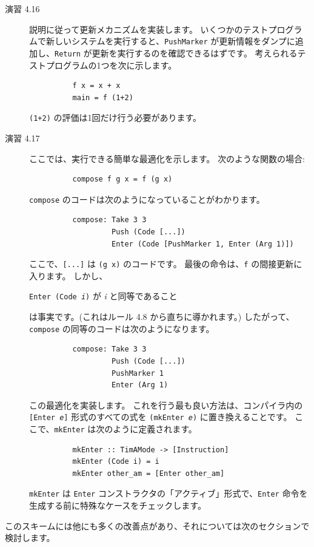 \documentclass{jbook}
\begin{document}
\begin{description}
	\item[演習 4.16] 説明に従って更新メカニズムを実装します。
		いくつかのテストプログラムで新しいシステムを実行すると、\texttt{PushMarker} が更新情報をダンプに追加し、\texttt{Return} が更新を実行するのを確認できるはずです。
		考えられるテストプログラムの1つを次に示します。
		\begin{verbatim}
          f x = x + x
          main = f (1+2)
        \end{verbatim}
		\texttt{(1+2)} の評価は1回だけ行う必要があります。
	\item[演習 4.17] ここでは、実行できる簡単な最適化を示します。
		次のような関数の場合:
		\begin{verbatim}
          compose f g x = f (g x)
        \end{verbatim}
		\texttt{compose} のコードは次のようになっていることがわかります。
		\begin{verbatim}
          compose: Take 3 3
                   Push (Code [...])
                   Enter (Code [PushMarker 1, Enter (Arg 1)])
        \end{verbatim}
		ここで、\texttt{[...]} は \texttt{(g x)} のコードです。
		最後の命令は、\texttt{f} の間接更新に入ります。
		しかし、
		\begin{center}
			\texttt{Enter (Code \textit{i})} が \textit{i} と同等であること
		\end{center}
		は事実です。(これはルール 4.8 から直ちに導かれます。)
		したがって、\texttt{compose} の同等のコードは次のようになります。
		\begin{verbatim}
          compose: Take 3 3
                   Push (Code [...])
                   PushMarker 1
                   Enter (Arg 1)
        \end{verbatim}
		この最適化を実装します。
		これを行う最も良い方法は、コンパイラ内の \texttt{[Enter \textit{e}]} 形式のすべての式を \texttt{(mkEnter \textit{e})} に置き換えることです。
		ここで、\texttt{mkEnter} は次のように定義されます。
		\begin{verbatim}
          mkEnter :: TimAMode -> [Instruction]
          mkEnter (Code i) = i
          mkEnter other_am = [Enter other_am]
        \end{verbatim}
		\texttt{mkEnter} は \texttt{Enter} コンストラクタの「アクティブ」形式で、\texttt{Enter} 命令を生成する前に特殊なケースをチェックします。
\end{description}

このスキームには他にも多くの改善点があり、それについては次のセクションで検討します。
\end{document}
